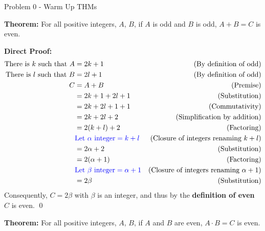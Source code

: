 \begin{problem}{Problem 0 - Warm Up THMs}
    \begin{highlight}
        \textbf{Theorem:} For all positive integers, $A$, $B$, if $A$ is odd and $B$ is odd, $A + B = C$ is even. \vspace*{1em}

        \textbf{Direct Proof:} \newline
        \begin{align*}
            \text{There is $k$ such that } A & = 2k + 1 & \text{(By definition of odd)} \\
            \text{There is $l$ such that } B & = 2l + 1 & \text{(By definition of odd)} \\
            C & = A + B & \text{(Premise)} \\
            & = 2k + 1 + 2l + 1 & \text{(Substitution)} \\
            & = 2k + 2l + 1 + 1 & \text{(Commutativity)} \\
            & = 2k + 2l + 2 & \text{(Simplification by addition)} \\
            & = 2(k + l) + 2 & \text{(Factoring)} \\
            & \textcolor{blue}{\text{Let } \alpha \text{ integer} = k + l} & \text{(Closure of integers renaming $k + l$)} \\
            & = 2\alpha + 2 & \text{(Substitution)} \\
            & = 2(\alpha + 1) & \text{(Factoring)} \\
            & \textcolor{blue}{\text{Let } \beta \text{ integer} = \alpha + 1} & \text{(Closure of integers renaming $\alpha + 1$)} \\
            & = 2\beta & \text{(Substitution)} \\
        \end{align*}
        Consequently, $C = 2\beta$ with $\beta$ is an integer, and thus by the \textbf{definition of even} $C$ is even. \qed
    \end{highlight}

    \begin{highlight}
        \textbf{Theorem:} For all positive integers, $A$, $B$, if $A$ and $B$ are even, $A \cdot B = C$ is even. \vspace*{1em}


\end{highlight}
\end{problem}
